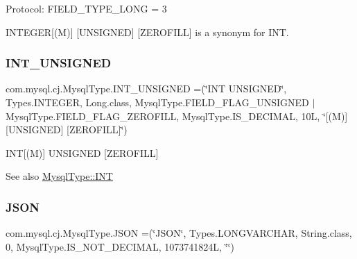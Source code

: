 Protocol\+: F\+I\+E\+L\+D\+\_\+\+T\+Y\+P\+E\+\_\+\+L\+O\+NG = 3

I\+N\+T\+E\+G\+ER\mbox{[}(M)\mbox{]} \mbox{[}U\+N\+S\+I\+G\+N\+ED\mbox{]} \mbox{[}Z\+E\+R\+O\+F\+I\+LL\mbox{]} is a synonym for I\+NT. \mbox{\label{enumcom_1_1mysql_1_1cj_1_1_mysql_type_aa15735863c9115877dc4d1f2c7690035}} 
\subsubsection{\texorpdfstring{I\+N\+T\+\_\+\+U\+N\+S\+I\+G\+N\+ED}{INT\_UNSIGNED}}
{\footnotesize\ttfamily com.\+mysql.\+cj.\+Mysql\+Type.\+I\+N\+T\+\_\+\+U\+N\+S\+I\+G\+N\+ED =(\char`\"{}I\+NT U\+N\+S\+I\+G\+N\+ED\char`\"{}, Types.\+I\+N\+T\+E\+G\+ER, Long.\+class, Mysql\+Type.\+F\+I\+E\+L\+D\+\_\+\+F\+L\+A\+G\+\_\+\+U\+N\+S\+I\+G\+N\+ED $\vert$ Mysql\+Type.\+F\+I\+E\+L\+D\+\_\+\+F\+L\+A\+G\+\_\+\+Z\+E\+R\+O\+F\+I\+LL, Mysql\+Type.\+I\+S\+\_\+\+D\+E\+C\+I\+M\+AL, 10\+L, \char`\"{}\mbox{[}(\+M)\mbox{]} \mbox{[}\+U\+N\+S\+I\+G\+N\+E\+D\mbox{]} \mbox{[}\+Z\+E\+R\+O\+F\+I\+L\+L\mbox{]}\char`\"{})}

I\+NT\mbox{[}(M)\mbox{]} U\+N\+S\+I\+G\+N\+ED \mbox{[}Z\+E\+R\+O\+F\+I\+LL\mbox{]}

\begin{DoxySeeAlso}{See also}
\mbox{\hyperlink{enumcom_1_1mysql_1_1cj_1_1_mysql_type_a01116c8fe484233659c251ee68f56d25}{Mysql\+Type\+::\+I\+NT}} 
\end{DoxySeeAlso}
\mbox{\label{enumcom_1_1mysql_1_1cj_1_1_mysql_type_a876e47530339c8cb791613d5a0d04f63}} 
\subsubsection{\texorpdfstring{J\+S\+ON}{JSON}}
{\footnotesize\ttfamily com.\+mysql.\+cj.\+Mysql\+Type.\+J\+S\+ON =(\char`\"{}J\+S\+ON\char`\"{}, Types.\+L\+O\+N\+G\+V\+A\+R\+C\+H\+AR, String.\+class, 0, Mysql\+Type.\+I\+S\+\_\+\+N\+O\+T\+\_\+\+D\+E\+C\+I\+M\+AL, 1073741824\+L, \char`\"{}\char`\"{})}

